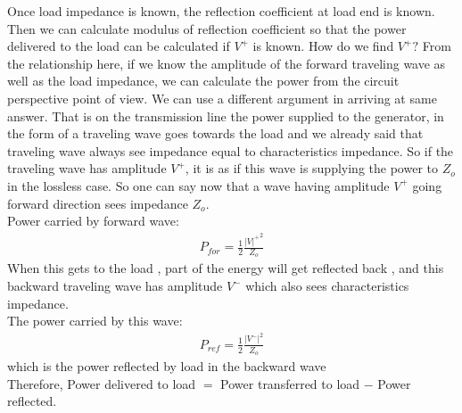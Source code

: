 Once load impedance is known, the reflection coefficient at load end is known. Then we can calculate modulus of reflection coefficient so that the power delivered to the load can be calculated if $V^+$ is known. How do we find $V^+ ? $ From the relationship here, if we know the amplitude of the forward traveling wave as well as the load impedance, we can calculate the power from the circuit perspective point of view. We can use a different argument in arriving at same answer. That is on the transmission line the power supplied to the generator, in the form of a traveling wave goes towards the load and we already said that traveling wave always see impedance equal to characteristics impedance. So if the traveling wave has amplitude $V^+$, it is as if this wave is supplying the power to $Z_o$ in the lossless case. So one can say now that  a wave having amplitude $V^+$ going forward direction sees impedance $Z_o$.\\
Power carried by forward wave:  
\begin{align*}
 P_{for}= \frac{1}{2} \frac{{| V |^+}^2}{Z_o}
\end{align*}
 When this gets to the load , part of the energy will get reflected back , and this backward traveling wave has amplitude $V^-$ which also sees characteristics impedance.\\
 The power carried by this wave:
 \begin{align*}
	P_{ref}= \frac{1}{2}\frac{{|V^-|}^2}{Z_o}
 \end{align*}
which is the power reflected by load in the backward wave\\

Therefore, Power delivered to load $=$ Power transferred to load $-$ Power reflected.

